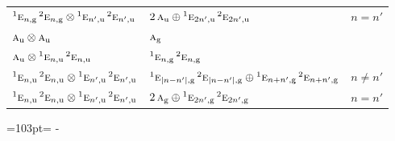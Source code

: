 \documentclass[10pt,a4paper]{article}
\newcommand{\needspace}[1]{\par\penalty-100\begingroup\dimen0=#1\relax\dimen2=\pagegoal
  \advance\dimen2-\pagetotal\ifdim\dimen0>\dimen2\relax\ifdim\dimen2>0pt\vfil\break\fi\fi
  \endgroup}
\numberwithin{equation}{section}
\newcommand{\irr}[1]{\text{\normalfont\scshape #1}}
\newcommand{\conjpair}[1]{{}^{#1}}
\newcommand{\ptag}[1]{\mathrm{#1}}
\newcommand{\irrprod}{\otimes}
\begin{document}
{\begin{longtable}{@{}l@{${}={}$}ll@{}}
$\conjpair{1}\irr{e}_{n,\ptag{g}}\,\conjpair{2}\irr{e}_{n,\ptag{g}}\irrprod \conjpair{1}\irr{e}_{n',\ptag{u}}\,\conjpair{2}\irr{e}_{n',\ptag{u}}$ & $2\,\irr{a}_{\ptag{u}}\oplus \conjpair{1}\irr{e}_{2n',\ptag{u}}\,\conjpair{2}\irr{e}_{2n',\ptag{u}}$ & $n = n'$\\
$\irr{a}_{\ptag{u}}\irrprod \irr{a}_{\ptag{u}}$ & $\irr{a}_{\ptag{g}}$ & \\
$\irr{a}_{\ptag{u}}\irrprod \conjpair{1}\irr{e}_{n,\ptag{u}}\,\conjpair{2}\irr{e}_{n,\ptag{u}}$ & $\conjpair{1}\irr{e}_{n,\ptag{g}}\,\conjpair{2}\irr{e}_{n,\ptag{g}}$ & \\
$\conjpair{1}\irr{e}_{n,\ptag{u}}\,\conjpair{2}\irr{e}_{n,\ptag{u}}\irrprod \conjpair{1}\irr{e}_{n',\ptag{u}}\,\conjpair{2}\irr{e}_{n',\ptag{u}}$ & $\conjpair{1}\irr{e}_{\lvert n-n'\rvert,\ptag{g}}\,\conjpair{2}\irr{e}_{\lvert n-n'\rvert,\ptag{g}}\oplus \conjpair{1}\irr{e}_{n+n',\ptag{g}}\,\conjpair{2}\irr{e}_{n+n',\ptag{g}}$ & $n \ne n'$\\
$\conjpair{1}\irr{e}_{n,\ptag{u}}\,\conjpair{2}\irr{e}_{n,\ptag{u}}\irrprod \conjpair{1}\irr{e}_{n',\ptag{u}}\,\conjpair{2}\irr{e}_{n',\ptag{u}}$ & $2\,\irr{a}_{\ptag{g}}\oplus \conjpair{1}\irr{e}_{2n',\ptag{g}}\,\conjpair{2}\irr{e}_{2n',\ptag{g}}$ & $n = n'$\\
\bottomrule\end{longtable}}
\needspace{103pt}
\end{document}
